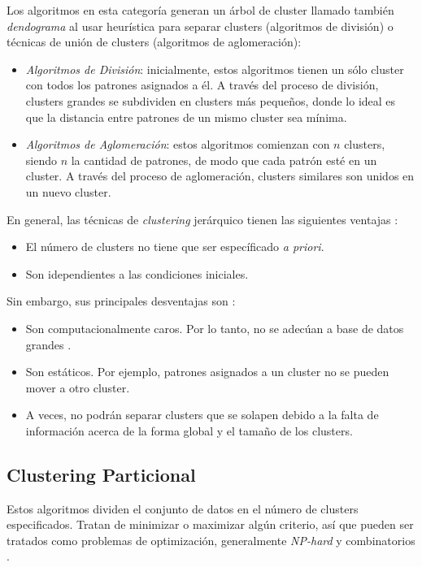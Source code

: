 Los algoritmos en esta categoría generan
un árbol de cluster llamado también \emph{dendograma} al usar heurística para
separar clusters (algoritmos de división) o técnicas de unión de clusters
(algoritmos de aglomeración):
    \begin{itemize}
        \item \emph{Algoritmos de División}: inicialmente, estos algoritmos
tienen un sólo cluster con todos los patrones asignados a él. A través del
proceso de división, clusters grandes se subdividen en clusters más pequeños,
donde lo ideal es que la distancia entre patrones de un mismo cluster sea
mínima.
        \item \emph{Algoritmos de Aglomeración}: estos algoritmos comienzan con
$n$ clusters, siendo $n$ la cantidad de patrones, de modo que cada patrón esté
en un cluster. A través del proceso de aglomeración, clusters similares son
unidos en un nuevo cluster.
    \end{itemize}
    En general, las técnicas de \emph{clustering} jerárquico tienen las siguientes
ventajas \cite{PSO_0}:
    \begin{itemize}
        \item El número de clusters no tiene que ser específicado \emph{a priori}.
        \item Son idependientes a las condiciones iniciales.
    \end{itemize}
    Sin embargo, sus principales desventajas son \cite{PSO_0}:
    \begin{itemize}
        \item Son computacionalmente caros. Por lo tanto, no se adecúan a base
de datos grandes \cite{DC_2}.
        \item Son estáticos. Por ejemplo, patrones asignados a un cluster no se
pueden mover a otro cluster.
        \item A veces, no podrán separar clusters que se solapen debido a la
falta de información acerca de la forma global y el tamaño de los clusters.
    \end{itemize}

\subsection{Clustering Particional} \label{sect:cpart}

    Estos algoritmos dividen el conjunto
de datos en el número de clusters especificados. Tratan de minimizar o maximizar
algún criterio, así que pueden ser tratados como problemas de optimización,
generalmente \emph{NP-hard} y combinatorios \cite{DC_3}.

